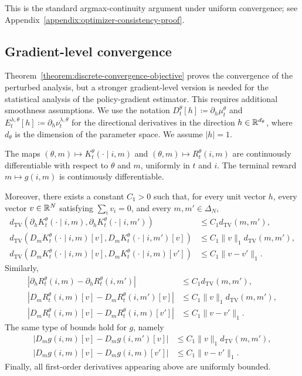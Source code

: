 This is the standard argmax-continuity argument under uniform convergence; see Appendix~\ref{appendix:optimizer-consistency-proof}.

\subsection{Gradient-level convergence}

Theorem~\ref{theorem:discrete-convergence-objective} proves the convergence of the perturbed analysis, but a stronger gradient-level version is needed for the statistical analysis of the policy-gradient estimator. This requires additional smoothness assumptions. We use the notation $D_t^\theta[h]\coloneqq \partial_h\mu_t^\theta$ and $E_t^{\lambda,\theta}[h]\coloneqq\partial_h \nu_t^{\lambda,\theta}$ for the directional derivatives in the direction $h\in\mathbb{R}^{d_\theta}$, where $d_\theta$ is the dimension of the parameter space. We assume $|h|=1$.

\begin{assumption}
    \label{ass:discrete-gradient-regularity}
    The maps $(\theta,m)\mapsto K_t^\theta(\cdot\mid i,m)$ and $(\theta,m)\mapsto R_t^\theta(i,m)$ are continuously differentiable with respect to $\theta$ and $m$, uniformly in $t$ and $i$. The terminal reward $m\mapsto g(i,m)$ is continuously differentiable.

    Moreover, there exists a constant $C_1 > 0$ such that, for every unit vector $h$, every vector $v\in\mathbb{R}^N$ satisfying $\sum_i v_i=0$, and every $m,m'\in\Delta_N$,
    \begin{align}
        d_\mathrm{TV}\left(\partial_h K_t^\theta(\cdot\mid i,m), \partial_h K_t^\theta(\cdot\mid i,m') \right) &\leq C_1 d_\mathrm{TV}(m,m'), \\
        d_\mathrm{TV}\left(D_m K_t^\theta(\cdot\mid i,m)[v], D_m K_t^\theta(\cdot\mid i,m')[v] \right) &\leq C_1\|v\|_1 d_\mathrm{TV}(m,m'), \\
        d_\mathrm{TV}\left(D_m K_t^\theta(\cdot\mid i,m)[v], D_m K_t^\theta(\cdot\mid i,m)[v'] \right) &\leq C_1 \|v-v'\|_1.
    \end{align}
    Similarly,
    \begin{align}
        \left|\partial_h R_t^\theta(i,m) - \partial_h R_t^\theta(i,m') \right| &\leq C_1d_\mathrm{TV}(m,m'), \\
        \left|D_m R_t^\theta(i,m)[v] - D_mR_t^\theta(i,m')[v] \right| &\leq C_1\|v\|_1 d_\mathrm{TV}(m,m'), \\
        \left|D_m R_t^\theta(i,m)[v] - D_mR_t^\theta(i,m)[v'] \right| &\leq C_1\|v-v'\|_1.
    \end{align}
    The same type of bounds hold for $g$, namely
    \begin{align}
        \left| D_mg(i,m)[v] - D_mg(i,m')[v]\right| &\leq C_1\|v\|_1 d_\mathrm{TV}(m,m'),\\
        \left| D_mg(i,m)[v] - D_mg(i,m)[v']\right| &\leq C_1\|v -v'\|_1.
    \end{align}
    Finally, all first-order derivatives appearing above are uniformly bounded.
\end{assumption}

